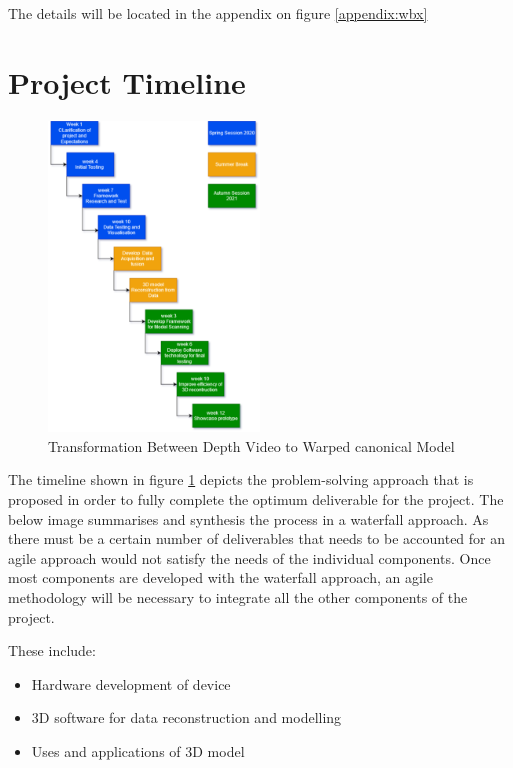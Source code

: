 \documentclass[12pt]{report}
\begin{document}
The details will be located in the appendix on figure \ref{appendix:wbx}
 
\section{Project Timeline}
\begin{figure} %
  \centering
  \includegraphics[width=0.5\textwidth]{timeline.png}
  \caption{Transformation Between Depth Video to Warped canonical Model}
  \label{Fig::timeline}
\end{figure}

The timeline shown in figure \ref{Fig::timeline} depicts the problem-solving approach that is proposed in order to fully complete the optimum deliverable for the project. 
The below image summarises and synthesis the process in a waterfall approach. As there must be a certain number of deliverables that needs to be accounted for an agile approach would not satisfy the needs of the individual components. 
Once most components are developed with the waterfall approach, an agile methodology will be necessary to integrate all the other components of the project.

These include:
\begin{itemize}
  \item Hardware development of device
  \item 3D software for data reconstruction and modelling 
  \item Uses and applications of 3D model
\end{itemize}
\end{document}
